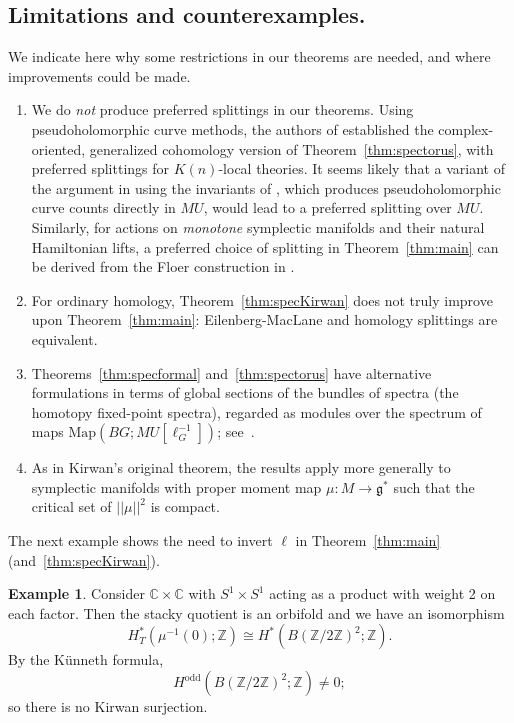 \documentclass[11pt, reqno]{amsart}
\theoremstyle{plain}
\theoremstyle{definition}
\newtheorem{ex}[thm]{Example}
\begin{document}
\subsection{Limitations and counterexamples.}
We indicate here why some restrictions in our theorems are needed, and where improvements could be made. 
\begin{enumerate}\itemsep0ex
\item We do \emph{not} produce preferred splittings in our theorems. Using pseudoholomorphic 
curve methods, the authors of \cite{BaiPomerleano} established the complex-oriented, generalized 
cohomology  version of Theorem~\ref{thm:spectorus}, with preferred splittings for $K(n)$-local 
theories.  It seems likely that a variant of the argument in \cite{BaiPomerleano} using the invariants of \cite{AbouzaidBai},  which produces pseudoholomorphic curve counts directly in $MU$,  would lead to a preferred splitting over $MU$.  Similarly, for actions on \emph{monotone} symplectic manifolds 
and their natural Hamiltonian lifts, a preferred choice of splitting in Theorem~\ref{thm:main} can be 
derived from the Floer construction in \cite{PomTel}. 
\item For ordinary homology, Theorem~\ref{thm:specKirwan} does not truly improve upon Theorem~\ref{thm:main}: 
Eilenberg-MacLane and homology splittings are equivalent.   
\item Theorems~\ref{thm:specformal} and~\ref{thm:spectorus} have alternative formulations in terms 
of global sections of the  bundles of spectra (the homotopy fixed-point spectra), 
regarded as modules over the spectrum of maps $\mathrm{Map}\!\left(BG;MU[\ell_G^{-1}]\right)$; 
see~\cite{MNN}.

\item As in  Kirwan's original theorem,  the results apply more generally to symplectic manifolds 
with proper moment map $\mu: M \to \mathfrak{g}^*$ such that the critical set of $||\mu||^2$ is compact.
\end{enumerate}

The next example shows the need to invert $\ell$ in Theorem~\ref{thm:main} (and~\ref{thm:specKirwan}).

\begin{ex} Consider $\mathbb{C} \times \mathbb{C}$ with $S^1 \times S^1$ acting as a product with weight 2 on each factor. 
Then the stacky quotient is an orbifold and we have an isomorphism  
\[
H^*_T(\mu^{-1}(0); \mathbb{Z}) \cong H^*(B(\mathbb{Z}/2\mathbb{Z})^2;\mathbb{Z}). 
\]
By the K\"unneth formula,  
\[
H^{\operatorname{odd}}(B(\mathbb{Z}/2\mathbb{Z})^2;\mathbb{Z}) \neq 0;
\] 
so there is no Kirwan surjection. 
\end{ex} 
\end{document}
